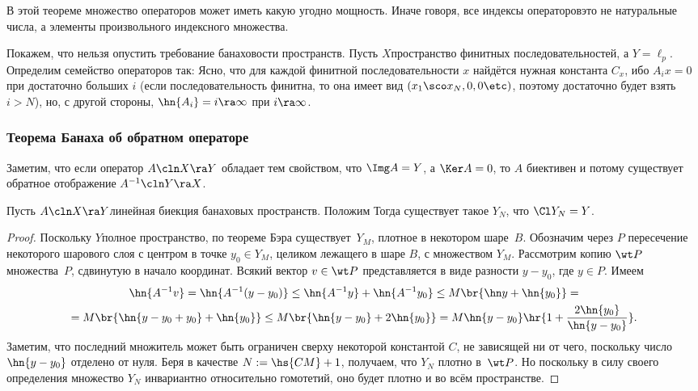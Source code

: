 \documentclass[a4paper]{article}
\begin{document}
\begin{note}
В этой теореме множество операторов может иметь какую угодно мощность.
Иначе говоря, все индексы операторов\т это не натуральные числа, а элементы произвольного
индексного множества.
\end{note}

\begin{note}
Покажем, что нельзя опустить требование банаховости пространств.
Пусть $X$\т пространство финитных последовательностей, а $Y = \ell_p$.
Определим семейство операторов так:
Ясно, что для каждой финитной последовательности $x$ найдётся нужная константа $C_x$, ибо
$A_i x = 0$ при достаточно больших $i$ (если последовательность финитна,
то она имеет вид $(x_1\sco x_N, 0,0\etc)$, поэтому достаточно будет взять $i > N$),
но, с другой стороны, $\hn{A_i} = i \ra \infty$ при $i \ra \infty$.
\end{note}


\subsubsection{Теорема Банаха об обратном операторе}

Заметим, что если оператор $A\cln X \ra Y$ обладает тем свойством, что $\Img A = Y$,
а $\Ker A = 0$, то $A$ биективен и потому существует обратное отображение $A^{-1}\cln Y \ra X$.

\begin{lemma}
Пусть $A\cln X \ra Y$\т линейная биекция банаховых пространств.
Положим
Тогда существует такое $Y_N$, что $\Cl Y_N = Y$.
\end{lemma}
\begin{proof}
Поскольку $Y$\т полное пространство, по теореме Бэра существует~$Y_M$, плотное в некотором шаре~$B$.
Обозначим через $P$ пересечение некоторого шарового слоя с центром в точке $y_0 \in Y_M$, целиком лежащего
в шаре $B$, с множеством $Y_M$. Рассмотрим копию $\wt P$ множества~$P$, сдвинутую в начало координат.
Всякий вектор $v \in \wt P$ представляется в виде разности $y - y_0$, где $y \in P$.
Имеем
\begin{multline*}
\hn{A^{-1}v} = \hn{A^{-1}(y-y_0)} \le \hn{A^{-1}y} + \hn{A^{-1}y_0} \le M\br{\hn y + \hn{y_0}} =\\=
M\br{\hn{y - y_0 + y_0} + \hn{y_0} } \le M\br{\hn{y -y_0} + 2\hn{y_0}} = M\hn{y-y_0}\hr{1 + \frac{2\hn{y_0}}{\hn{y-y_0}}}.
\end{multline*}
Заметим, что последний множитель может быть ограничен сверху некоторой константой $C$,
не зависящей ни от чего, поскольку число $\hn{y-y_0}$ отделено от нуля. Беря
в качестве $N := \hs{CM} + 1$, получаем, что $Y_N$ плотно в~$\wt P$. Но поскольку
в силу своего определения множество $Y_N$ инвариантно относительно
гомотетий, оно будет плотно и во всём пространстве.
\end{proof}
\end{document}
